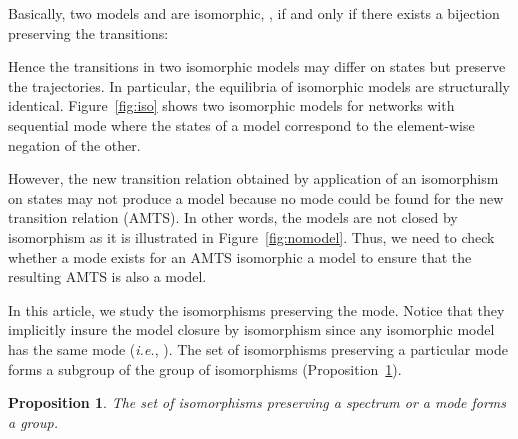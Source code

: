 \documentclass[12pt]{elsarticle}
\newtheorem{proposition}{Proposition}
\newcommand{\abbrev}[1]{#1, \relax}
\newcommand{\ie}[0]{\abbrev{\textit{i.e.}}}
\begin{document}
Basically, two models  and  are isomorphic, , if and only if there exists a bijection  preserving the transitions:

 Hence the transitions in two isomorphic models may differ on states but preserve the trajectories. In particular, the equilibria of isomorphic models are structurally identical. 
Figure~\ref{fig:iso} shows two isomorphic models for networks with sequential mode where the states of a model correspond to the element-wise negation of the other. 

 However, the new transition relation obtained by application of an isomorphism on states may not produce a model because no mode could be found for the new transition relation (AMTS). In other words, the models are not closed by isomorphism as it is illustrated in Figure~\ref{fig:nomodel}. Thus, we need to check whether a mode exists for an AMTS isomorphic a model to ensure that the resulting AMTS is also a model. 

In this article, we study the isomorphisms preserving the mode. Notice that they implicitly insure the model closure by isomorphism since any isomorphic model has the same mode (\ie ). 
The set of isomorphisms preserving a particular mode forms a subgroup of the group of isomorphisms (Proposition~\ref{prop:subgroup}).

\begin{proposition} 
\label{prop:subgroup}
The set of isomorphisms preserving a spectrum or a mode forms a group.
\end{proposition}
\end{document}
